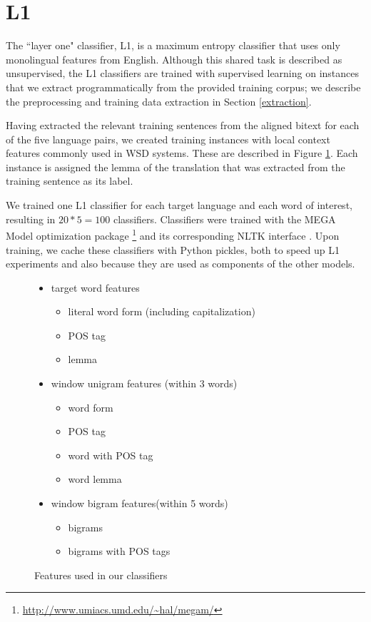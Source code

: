 \documentclass[11pt,letterpaper]{article}
\begin{document}
\section{L1}
The ``layer one" classifier, L1, is a maximum entropy classifier that
uses only monolingual features from English. Although this shared task is
described as unsupervised, the L1 classifiers are trained with supervised
learning on instances that we extract programmatically from the provided
training corpus; we describe the preprocessing and training data extraction in
Section \ref{extraction}.

Having extracted the relevant training sentences from the aligned bitext for
each of the five language pairs, we created training instances with local
context features commonly used in WSD systems. These are described in Figure
\ref{fig:features}. Each instance is assigned the lemma of the translation that
was extracted from the training sentence as its label.

We trained one L1 classifier for each target language and each word of
interest, resulting in $20*5 = 100$ classifiers. Classifiers were trained with
the MEGA Model optimization package \cite{daume04cg-bfgs}
\footnote{\url{http://www.umiacs.umd.edu/~hal/megam/}} and its corresponding
NLTK interface \cite{nltkbook}. Upon training, we cache these classifiers with
Python pickles, both to speed up L1 experiments and also because they are used
as components of the other models.

\begin{figure}
  \begin{itemize}  %
  
  \item target word features
  \begin{itemize}  %
       \item literal word form (including capitalization)
       \item POS tag
       \item lemma
  \end{itemize}
  \item window unigram features (within 3 words)
  \begin{itemize} %
  		\item word form
  		\item POS tag
  		\item word with POS tag
  		\item word lemma
  \end{itemize}
  \item window bigram features(within 5 words)
  \begin{itemize} %
  		\item bigrams 
  		\item bigrams with POS tags
  \end{itemize}  
  \end{itemize}   %
  \caption{Features used in our classifiers}
  \label{fig:features}
\end{figure}
\end{document}
